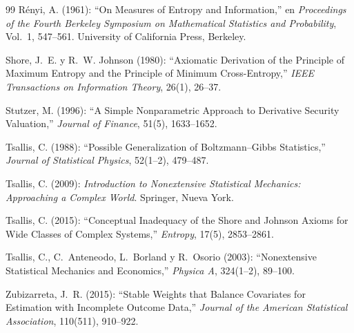 \documentclass[11pt]{article}
\begin{document}
\begin{thebibliography}{99}
R\'enyi, A. (1961): ``On Measures of Entropy and Information,'' en
\textit{Proceedings of the Fourth Berkeley Symposium on Mathematical
Statistics and Probability}, Vol.~1, 547--561. University of California Press, Berkeley.

Shore, J.~E. y R.~W. Johnson (1980): ``Axiomatic Derivation of the
Principle of Maximum Entropy and the Principle of Minimum Cross-Entropy,''
\textit{IEEE Transactions on Information Theory}, 26(1), 26--37.

Stutzer, M. (1996): ``A Simple Nonparametric Approach to Derivative Security
Valuation,'' \textit{Journal of Finance}, 51(5), 1633--1652.

Tsallis, C. (1988): ``Possible Generalization of Boltzmann--Gibbs
Statistics,'' \textit{Journal of Statistical Physics}, 52(1--2), 479--487.

Tsallis, C. (2009): \textit{Introduction to Nonextensive Statistical
Mechanics: Approaching a Complex World}. Springer, Nueva York.

Tsallis, C. (2015): ``Conceptual Inadequacy of the Shore and Johnson Axioms
for Wide Classes of Complex Systems,'' \textit{Entropy}, 17(5), 2853--2861.

Tsallis, C., C.~Anteneodo, L.~Borland y R.~Osorio (2003): ``Nonextensive
Statistical Mechanics and Economics,'' \textit{Physica A}, 324(1--2), 89--100.

Zubizarreta, J.~R. (2015): ``Stable Weights that Balance Covariates for
Estimation with Incomplete Outcome Data,'' \textit{Journal of the American
Statistical Association}, 110(511), 910--922.
\end{thebibliography}
\end{document}
